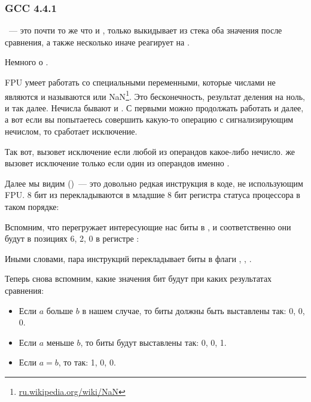 \subsubsection{GCC 4.4.1}



\FUCOMPP~--- это почти то же что и \FCOM, только выкидывает из стека оба значения после сравнения, 
а также несколько иначе реагирует на .

Немного о .

\newcommand{\NANFN}{\footnote{\href{http://go.yurichev.com/17129}{ru.wikipedia.org/wiki/NaN}}}

FPU умеет работать со специальными переменными, которые числами не являются и называются  или 
\gls{NaN}\NANFN. 
Это бесконечность, результат деления на ноль, и так далее. Нечисла бывают  и . 
С первыми можно продолжать работать и далее, а вот если вы попытаетесь совершить какую-то операцию 
с сигнализирующим нечислом, то сработает исключение.

Так вот, \FCOM вызовет исключение если любой из операндов какое-либо нечисло.
\FUCOM же вызовет исключение только если один из операндов именно .

\label{SAHF}
Далее мы видим \SAHF ()~--- это довольно редкая инструкция в коде, не использующим FPU. 
8 бит из \AH перекладываются в младшие 8 бит регистра статуса процессора в таком порядке:



Вспомним, что \FNSTSW перегружает интересующие нас биты \CThreeBits в \AH, 
и соответственно они будут в позициях 6, 2, 0 в регистре \AH:



Иными словами, пара инструкций  перекладывает биты \CThreeBits в флаги \ZF, \PF, \CF.

Теперь снова вспомним, какие значения бит \CThreeBits будут при каких результатах сравнения:

\begin{itemize}
\item Если $a$ больше $b$ в нашем случае, то биты \CThreeBits должны быть выставлены так: 0, 0, 0.
\item Если $a$ меньше $b$, то биты будут выставлены так: 0, 0, 1.
\item Если $a=b$, то так: 1, 0, 0.
\end{itemize}

